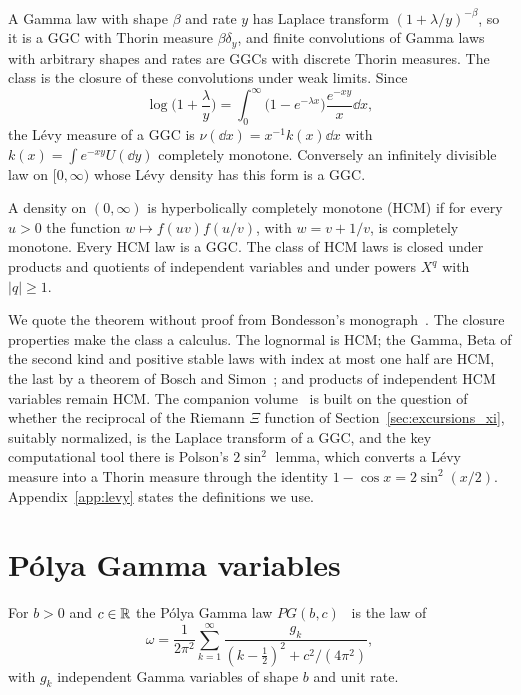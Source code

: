 A Gamma law with shape $\beta$ and rate $y$ has Laplace transform $(1+\lambda/y)^{-\beta}$, so it is a GGC with Thorin measure $\beta\delta_y$, and finite convolutions of Gamma laws with arbitrary shapes and rates are GGCs with discrete Thorin measures. The class is the closure of these convolutions under weak limits. Since
\[
\log\Big(1+\frac{\lambda}{y}\Big) = \int_0^\infty\big(1-e^{-\lambda x}\big)\frac{e^{-xy}}{x}\dd x,
\]
the L\'evy measure of a GGC is $\nu(\dd x) = x^{-1}k(x)\dd x$ with $k(x) = \int e^{-xy}U(\dd y)$ completely monotone. Conversely an infinitely divisible law on $[0,\infty)$ whose L\'evy density has this form is a GGC.

\begin{theorem}[Bondesson]
A density on $(0,\infty)$ is hyperbolically completely monotone (HCM) if for every $u>0$ the function $w\mapsto f(uv)f(u/v)$, with $w = v + 1/v$, is completely monotone. Every HCM law is a GGC. The class of HCM laws is closed under products and quotients of independent variables and under powers $X^q$ with $|q|\geq1$.
\end{theorem}

We quote the theorem without proof from Bondesson's monograph~\cite[Chapter~5]{bondesson1992}. The closure properties make the class a calculus. The lognormal is HCM; the Gamma, Beta of the second kind and positive stable laws with index at most one half are HCM, the last by a theorem of Bosch and Simon~\cite{bosch2016}; and products of independent HCM variables remain HCM. The companion volume~\cite{polsonh8} is built on the question of whether the reciprocal of the Riemann $\Xi$ function of Section~\ref{sec:excursions_xi}, suitably normalized, is the Laplace transform of a GGC, and the key computational tool there is Polson's $2\sin^2$ lemma, which converts a L\'evy measure into a Thorin measure through the identity $1-\cos x = 2\sin^2(x/2)$. Appendix~\ref{app:levy} states the definitions we use.

\section{P\'olya Gamma variables}

\begin{definition}
For $b>0$ and $c\in\mathbb{R}$ the P\'olya Gamma law $PG(b,c)$~\cite{psw2013} is the law of
\[
\omega = \frac{1}{2\pi^2}\sum_{k=1}^\infty\frac{g_k}{(k-\frac12)^2 + c^2/(4\pi^2)},
\]
with $g_k$ independent Gamma variables of shape $b$ and unit rate.
\end{definition}

